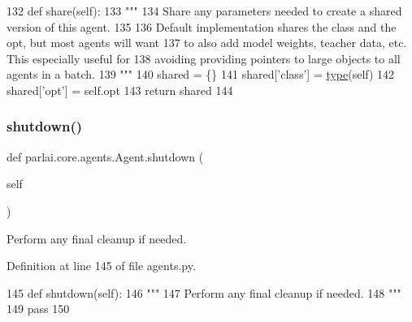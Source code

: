 \begin{DoxyCode}
132     \textcolor{keyword}{def }share(self):
133         \textcolor{stringliteral}{"""}
134 \textcolor{stringliteral}{        Share any parameters needed to create a shared version of this agent.}
135 \textcolor{stringliteral}{}
136 \textcolor{stringliteral}{        Default implementation shares the class and the opt, but most agents will want}
137 \textcolor{stringliteral}{        to also add model weights, teacher data, etc. This especially useful for}
138 \textcolor{stringliteral}{        avoiding providing pointers to large objects to all agents in a batch.}
139 \textcolor{stringliteral}{        """}
140         shared = \{\}
141         shared[\textcolor{stringliteral}{'class'}] = \hyperlink{namespaceparlai_1_1agents_1_1tfidf__retriever_1_1build__tfidf_ad5dfae268e23f506da084a9efb72f619}{type}(self)
142         shared[\textcolor{stringliteral}{'opt'}] = self.opt
143         \textcolor{keywordflow}{return} shared
144 
\end{DoxyCode}
\mbox{\label{classparlai_1_1core_1_1agents_1_1Agent_a801e5ca2a5e8e96a72f0c04549008e8f}} 
\subsubsection{\texorpdfstring{shutdown()}{shutdown()}}
{\footnotesize\ttfamily def parlai.\+core.\+agents.\+Agent.\+shutdown (\begin{DoxyParamCaption}\item[{}]{self }\end{DoxyParamCaption})}

\begin{DoxyVerb}Perform any final cleanup if needed.
\end{DoxyVerb}
 

Definition at line 145 of file agents.\+py.


\begin{DoxyCode}
145     \textcolor{keyword}{def }shutdown(self):
146         \textcolor{stringliteral}{"""}
147 \textcolor{stringliteral}{        Perform any final cleanup if needed.}
148 \textcolor{stringliteral}{        """}
149         \textcolor{keywordflow}{pass}
150 
\end{DoxyCode}
\mbox{\label{classparlai_1_1core_1_1agents_1_1Agent_a005f62f977e8a7ebf91b9646307153bc}} 
